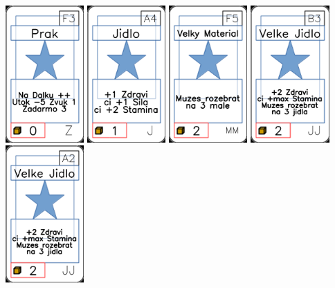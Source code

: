 \documentclass[a4paper]{article}
\begin{document}
	\includegraphics[width=3.0cm]{img-1_87}
	\includegraphics[width=3.0cm]{img-1_3}
	\includegraphics[width=3.0cm]{img-1_59}
	\includegraphics[width=3.0cm]{img-1_37}
	\includegraphics[width=3.0cm]{img-1_31}
\end{document}
